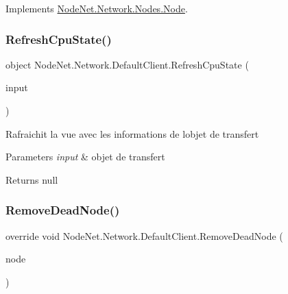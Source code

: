 Implements \hyperlink{class_node_net_1_1_network_1_1_nodes_1_1_node_a953dce3f4779355cd3bf542ac6d1d3d8}{Node\+Net.\+Network.\+Nodes.\+Node}.

\mbox{\label{class_node_net_1_1_network_1_1_default_client_ac38bbde06cb838bb7b270a2dc49502df}} 
\subsubsection{\texorpdfstring{Refresh\+Cpu\+State()}{RefreshCpuState()}}
{\footnotesize\ttfamily object Node\+Net.\+Network.\+Default\+Client.\+Refresh\+Cpu\+State (\begin{DoxyParamCaption}\item[{\hyperlink{class_node_net_1_1_data_1_1_data_input}{Data\+Input}}]{input }\end{DoxyParamCaption})}



Rafraichit la vue avec les informations de l\textquotesingle{}objet de transfert 


\begin{DoxyParams}{Parameters}
{\em input} & objet de transfert\\
\hline
\end{DoxyParams}
\begin{DoxyReturn}{Returns}
null
\end{DoxyReturn}
\mbox{\label{class_node_net_1_1_network_1_1_default_client_a327f7dba7178df6b2adef200ef4b3113}} 
\subsubsection{\texorpdfstring{Remove\+Dead\+Node()}{RemoveDeadNode()}}
{\footnotesize\ttfamily override void Node\+Net.\+Network.\+Default\+Client.\+Remove\+Dead\+Node (\begin{DoxyParamCaption}\item[{\hyperlink{class_node_net_1_1_network_1_1_nodes_1_1_node}{Node}}]{node }\end{DoxyParamCaption})\hspace{0.3cm}{\ttfamily [virtual]}}



